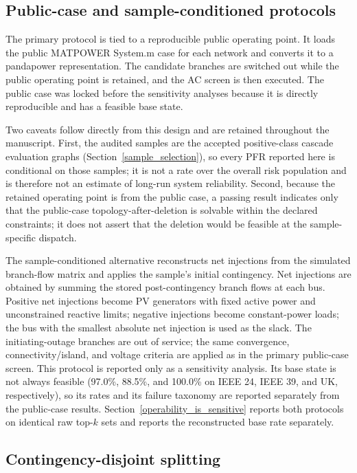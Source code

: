 \subsection{Public-case and sample-conditioned protocols}\label{public_case_counterfactual_feasibility_audit}

The primary protocol is tied to a reproducible public operating point. It loads the public MATPOWER System.m case for each network and converts it to a pandapower representation. The candidate branches are switched out while the public operating point is retained, and the AC screen is then executed. The public case was locked before the sensitivity analyses because it is directly reproducible and has a feasible base state.

Two caveats follow directly from this design and are retained throughout the manuscript. First, the audited samples are the accepted positive-class cascade evaluation graphs (Section~\ref{sample_selection}), so every PFR reported here is conditional on those samples; it is not a rate over the overall risk population and is therefore not an estimate of long-run system reliability. Second, because the retained operating point is from the public case, a passing result indicates only that the public-case topology-after-deletion is solvable within the declared constraints; it does not assert that the deletion would be feasible at the sample-specific dispatch.

The sample-conditioned alternative reconstructs net injections from the simulated branch-flow matrix and applies the sample's initial contingency. Net injections are obtained by summing the stored post-contingency branch flows at each bus. Positive net injections become PV generators with fixed active power and unconstrained reactive limits; negative injections become constant-power loads; the bus with the smallest absolute net injection is used as the slack. The initiating-outage branches are out of service; the same convergence, connectivity/island, and voltage criteria are applied as in the primary public-case screen. This protocol is reported only as a sensitivity analysis. Its base state is not always feasible (97.0\%, 88.5\%, and 100.0\% on IEEE 24, IEEE 39, and UK, respectively), so its rates and its failure taxonomy are reported separately from the public-case results. Section~\ref{operability_is_sensitive} reports both protocols on identical raw top-$k$ sets and reports the reconstructed base rate separately.

\subsection{Contingency-disjoint splitting}\label{contingency_disjoint_splitting}

